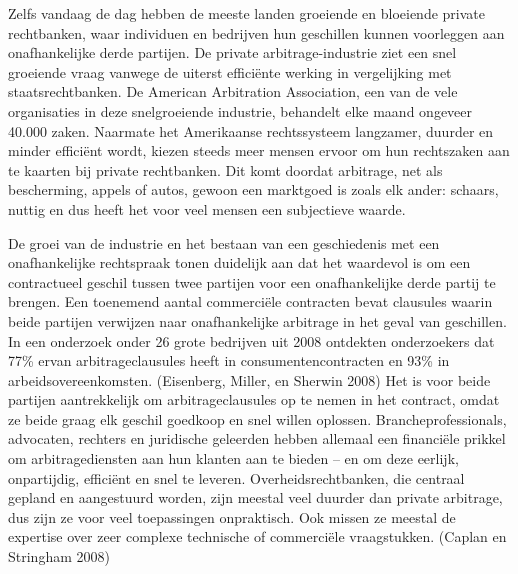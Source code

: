 \documentclass[
  a5paper,
  smalldemyvopaper,11pt,twoside,onecolumn,openright,extrafontsizes,
hidelinks]{memoir}
\begin{document}
Zelfs vandaag de dag hebben de meeste landen groeiende en bloeiende
private rechtbanken, waar individuen en bedrijven hun geschillen kunnen
voorleggen aan onafhankelijke derde partijen. De private
arbitrage-industrie ziet een snel groeiende vraag vanwege de uiterst
efficiënte werking in vergelijking met staatsrechtbanken. De American
Arbitration Association, een van de vele organisaties in deze
snelgroeiende industrie, behandelt elke maand ongeveer 40.000 zaken.
Naarmate het Amerikaanse rechtssysteem langzamer, duurder en minder
efficiënt wordt, kiezen steeds meer mensen ervoor om hun rechtszaken aan
te kaarten bij private rechtbanken. Dit komt doordat arbitrage, net als
bescherming, appels of autos, gewoon een marktgoed is zoals elk ander:
schaars, nuttig en dus heeft het voor veel mensen een subjectieve
waarde.

De groei van de industrie en het bestaan van een geschiedenis met een
onafhankelijke rechtspraak tonen duidelijk aan dat het waardevol is om
een contractueel geschil tussen twee partijen voor een onafhankelijke
derde partij te brengen. Een toenemend aantal commerciële contracten
bevat clausules waarin beide partijen verwijzen naar onafhankelijke
arbitrage in het geval van geschillen. In een onderzoek onder 26 grote
bedrijven uit 2008 ontdekten onderzoekers dat 77\% ervan
arbitrageclausules heeft in consumentencontracten en 93\% in
arbeidsovereenkomsten. (Eisenberg, Miller, en Sherwin 2008) Het is voor
beide partijen aantrekkelijk om arbitrageclausules op te nemen in het
contract, omdat ze beide graag elk geschil goedkoop en snel willen
oplossen. Brancheprofessionals, advocaten, rechters en juridische
geleerden hebben allemaal een financiële prikkel om arbitragediensten
aan hun klanten aan te bieden -- en om deze eerlijk, onpartijdig,
efficiënt en snel te leveren. Overheidsrechtbanken, die centraal gepland
en aangestuurd worden, zijn meestal veel duurder dan private arbitrage,
dus zijn ze voor veel toepassingen onpraktisch. Ook missen ze meestal de
expertise over zeer complexe technische of commerciële vraagstukken.
(Caplan en Stringham 2008)
\end{document}
